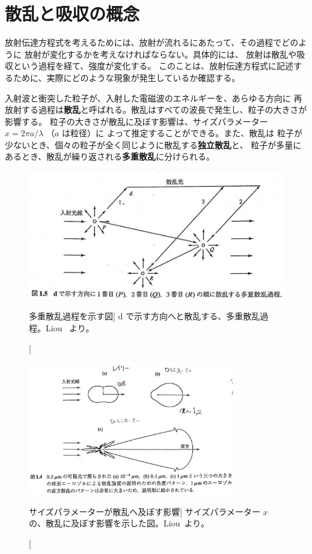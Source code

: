 \documentclass[article,twoside]{dennou777}
\newcommand{\hmemph}[1]{\textbf{#1}}
\begin{document}
\section{散乱と吸収の概念}
放射伝達方程式を考えるためには、放射が流れるにあたって、その過程でどのように
放射が変化するかを考えなければならない。具体的には、
放射は散乱や吸収という過程を経て、強度が変化する。
このことは、放射伝達方程式に記述するために、実際にどのような現象が発生しているか確認する。

入射波と衝突した粒子が、入射した電磁波のエネルギーを、あらゆる方向に
再放射する過程は\hmemph{散乱}と呼ばれる。散乱はすべての波長で発生し、粒子の大きさが影響する。
粒子の大きさが散乱に及ぼす影響は、サイズパラメーター $x=2\pi a/\lambda$ （$a$ は粒径）に
よって推定することができる。また、散乱は
粒子が少ないとき、個々の粒子が全く同じように散乱する\hmemph{独立散乱}と、
粒子が多量にあるとき、散乱が繰り返される\hmemph{多重散乱}に分けられる。

\begin{figure}[t]
	\includegraphics[width=\linewidth]{mscatter.jpg}
	\caption
		[多重散乱過程を示す図]
		{$\mathrm{d}$ で示す方向へと散乱する、多重散乱過程。Liou~\cite{liou} より。}
\end{figure}
\begin{figure}[t]
	\includegraphics[width=0.8\textwidth]{scatter.jpg}
	\caption
		[サイズパラメーターが散乱へ及ぼす影響]
		{サイズパラメーター $x$ の、散乱に及ぼす影響を示した図。Liou~\cite{liou}より。}
\end{figure}
\end{document}
